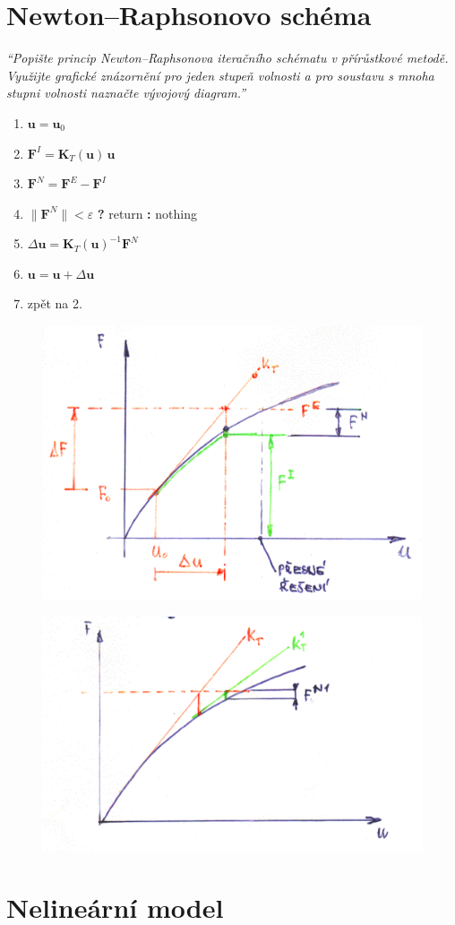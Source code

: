 \documentclass{article}
\begin{document}
	\section{Newton–Raphsonovo schéma}
	\emph{``Popište princip Newton–Raphsonova iteračního schématu v přírůstkové metodě. Využijte grafické znázornění pro jeden stupeň volnosti a pro soustavu s mnoha stupni volnosti naznačte vývojový diagram.''}
	\begin{enumerate}
		\item $\bm{u} = \bm{u}_0$
		\item $\bm{F}^I = \bm{K}_T(\bm{u})\,\bm{u}$
		\item $\bm{F}^N = \bm{F}^E - \bm{F}^I$
		\item $\|\bm{F}^N\| < \varepsilon$ \textbf{?} return \textbf{:} nothing
		\item $\Delta \bm{u} = \bm{K}_T(\bm{u})^{-1} \bm{F}^N$
		\item $\bm{u} = \bm{u} + \Delta \bm{u}$
		\item zpět na 2.
	\end{enumerate}
	\begin{figure}[h!]
		\centering
		\includegraphics[width=.5\linewidth]{figs/NR1.png}
	\end{figure}
	\begin{figure}[h!]
		\centering
		\includegraphics[width=.5\linewidth]{figs/NR2.png}
	\end{figure}

	\section{Nelineární model}
\end{document}
